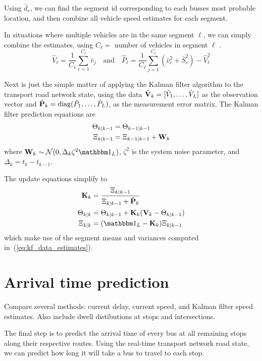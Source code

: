 \documentclass[draftcls,a4paper,onecolumn]{IEEEtran}\usepackage[]{graphicx}\usepackage[]{color}
\begin{document}
Using $\bar d_c$, we can find the segment id corresponding to each busses most probable location,
and then combine all vehicle speed estimates for each segment.

In situations where multiple vehicles are in the same segment $\ell$, 
we can simply combine the estimates, using $C_\ell = $ number of vehicles in segment $\ell$ 
\cite{cn}.
\begin{equation}
  \label{eq:kf_data_estimates}
  \hat V_\ell = \frac{1}{C_\ell} \sum_{c=1}^{C_\ell} \bar v_j \quad\text{and}\quad
  \hat P_\ell = \frac{1}{C_\ell} \sum_{j=1}^{C_\ell} \left(\bar v_c^2 + \bar S_c^2\right) - \hat V_\ell^2
\end{equation}

Next is just the simple matter of applying the Kalman filter algorithm \cite{Anderson_2012} 
to the transport road network state,
using the data \mbox{$\hat{\mathbf{V}}_k = [\hat V_1, \ldots, \hat V_L]$} as the observation vector
and \mbox{$\hat{\mathbf{P}}_k = \textrm{diag}(\hat P_1, \ldots, \hat P_L)$},
as the measurement error matrix.
The Kalman filter prediction equations are
\begin{align}
  \Theta_{k|k-1} &= \Theta_{k-1|k-1} \\
  \Xi_{k|k-1} &= \Xi_{k-1|k-1} + \mathbf{W}_k
\end{align}
where $\bW_k \sim \mathcal{N}(0, \Delta_k\zeta^2\eye_L)$, $\zeta^2$ is the system noise parameter,
and $\Delta_k = t_k - t_{k-1}$.

The update equations simplify to
\begin{align}
  \bK_k &= \frac{\Xi_{k|k-1}}{\Xi_{k|k-1} + \hat\bP_k} \\
  \Theta_{k|k} &= \Theta_{k|k-1} + \bK_k(\bV_k - \Theta_{k|k-1}) \\
  \Xi_{k|k} &= (\eye_L - \bK_k) \Xi_{k|k-1}
\end{align}
which make use of the segment means and variances computed in~(\ref{eq:kf_data_estimates}).


\section{Arrival time prediction}
\label{sec:arrival_time}


Compare several methods:
current delay, current speed, and Kalman filter speed estimates.
Also include dwell distibutions at stops and intersections.


The final step is to predict the arrival time of every bus 
at all remaining stops along their respective routes.
Using the real-time transport network road state, 
we can predict how long it will take a bus to travel 
to each stop.
\end{document}
